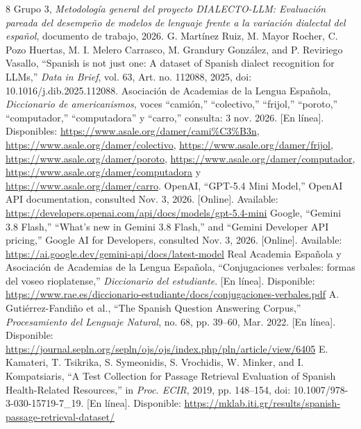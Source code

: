 \documentclass[conference]{IEEEtran}
\begin{document}
\begin{thebibliography}{8}
 Grupo 3, \emph{Metodología general del proyecto DIALECTO-LLM: Evaluación pareada del desempeño de modelos de lenguaje frente a la variación dialectal del español}, documento de trabajo, 2026.
 G. Martínez Ruiz, M. Mayor Rocher, C. Pozo Huertas, M. I. Melero Carrasco, M. Grandury González, and P. Reviriego Vasallo, ``Spanish is not just one: A dataset of Spanish dialect recognition for LLMs,'' \emph{Data in Brief}, vol. 63, Art. no. 112088, 2025, doi: 10.1016/j.dib.2025.112088.
 Asociación de Academias de la Lengua Española, \emph{Diccionario de americanismos}, voces ``camión,'' ``colectivo,'' ``frijol,'' ``poroto,'' ``computador,'' ``computadora'' y ``carro,'' consulta: 3 nov. 2026. [En línea]. Disponibles: \url{https://www.asale.org/damer/cami%C3%B3n}, \url{https://www.asale.org/damer/colectivo}, \url{https://www.asale.org/damer/frijol}, \url{https://www.asale.org/damer/poroto}, \url{https://www.asale.org/damer/computador}, \url{https://www.asale.org/damer/computadora} y \url{https://www.asale.org/damer/carro}.
 OpenAI, ``GPT-5.4 Mini Model,'' OpenAI API documentation, consulted Nov. 3, 2026. [Online]. Available: \url{https://developers.openai.com/api/docs/models/gpt-5.4-mini}
 Google, ``Gemini 3.8 Flash,'' ``What's new in Gemini 3.8 Flash,'' and ``Gemini Developer API pricing,'' Google AI for Developers, consulted Nov. 3, 2026. [Online]. Available: \url{https://ai.google.dev/gemini-api/docs/latest-model}
 Real Academia Española y Asociación de Academias de la Lengua Española, ``Conjugaciones verbales: formas del voseo rioplatense,'' \emph{Diccionario del estudiante}. [En línea]. Disponible: \url{https://www.rae.es/diccionario-estudiante/docs/conjugaciones-verbales.pdf}
 A. Gutiérrez-Fandiño et al., ``The Spanish Question Answering Corpus,'' \emph{Procesamiento del Lenguaje Natural}, no. 68, pp. 39--60, Mar. 2022. [En línea]. Disponible: \url{https://journal.sepln.org/sepln/ojs/ojs/index.php/pln/article/view/6405}
 E. Kamateri, T. Tsikrika, S. Symeonidis, S. Vrochidis, W. Minker, and I. Kompatsiaris, ``A Test Collection for Passage Retrieval Evaluation of Spanish Health-Related Resources,'' in \emph{Proc. ECIR}, 2019, pp. 148--154, doi: 10.1007/978-3-030-15719-7\_19. [En línea]. Disponible: \url{https://mklab.iti.gr/results/spanish-passage-retrieval-dataset/}
\end{thebibliography}
\end{document}
